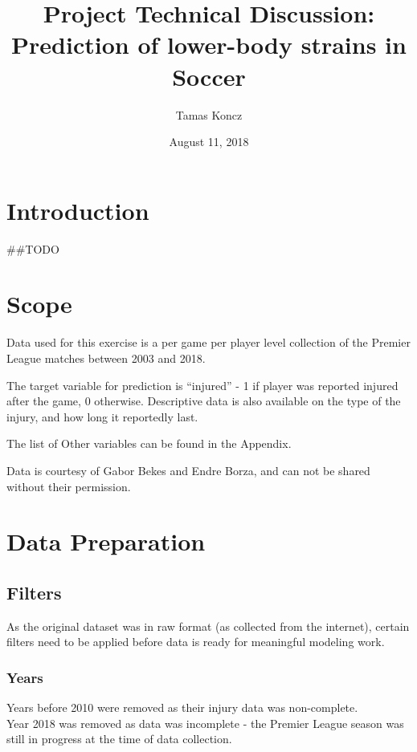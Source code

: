 \documentclass[]{article}
\title{Project Technical Discussion: Prediction of lower-body strains in Soccer}
\author{Tamas Koncz}
\date{August 11, 2018}
\begin{document}
\maketitle

{
\setcounter{tocdepth}{2}
\tableofcontents
}
\section{Introduction}\label{introduction}

{\#\#TODO} \pagebreak

\section{Scope}\label{scope}

Data used for this exercise is a per game per player level collection of
the Premier League matches between 2003 and 2018.

The target variable for prediction is ``injured'' - 1 if player was
reported injured after the game, 0 otherwise. Descriptive data is also
available on the type of the injury, and how long it reportedly last.

The list of Other variables can be found in the Appendix.

Data is courtesy of Gabor Bekes and Endre Borza, and can not be shared
without their permission.

\section{Data Preparation}\label{data-preparation}

\subsection{Filters}\label{filters}

As the original dataset was in raw format (as collected from the
internet), certain filters need to be applied before data is ready for
meaningful modeling work.

\subsubsection{Years}\label{years}

Years before 2010 were removed as their injury data was non-complete.\\
Year 2018 was removed as data was incomplete - the Premier League season
was still in progress at the time of data collection.
\end{document}
